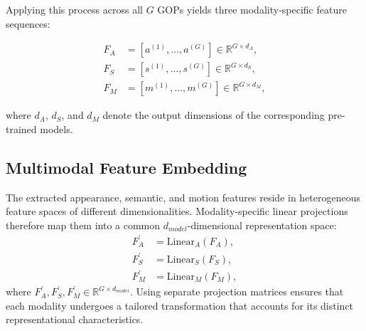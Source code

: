 Applying this process across all $G$ GOPs yields three modality-specific feature sequences:

\begin{align}
F_A&=\left[a^{\left(1\right)},\ldots,a^{\left(G\right)}\right]\in\mathbb{R}^{G\times d_A},\\
F_S&=\left[s^{\left(1\right)},\ldots,s^{\left(G\right)}\right]\in\mathbb{R}^{G\times d_S},\\
F_M&=\left[m^{\left(1\right)},\ldots,m^{\left(G\right)}\right]\in\mathbb{R}^{G\times d_M},
\end{align}


where $d_A$, $d_S$, and $d_M$ denote the output dimensions of the corresponding pre-trained models.


\subsection{Multimodal Feature Embedding}
\label{subsec:subsec_43_feat_emb}
The extracted appearance, semantic, and motion features reside in heterogeneous feature spaces of different dimensionalities. Modality-specific linear projections therefore map them into a common $d_{\textit{model}}$-dimensional representation space:
\begin{align}
F_A^\prime&={\mathrm{Linear}}_A(F_A),\\
F_S^\prime&={\mathrm{Linear}}_S(F_S),\\
F_M^\prime&={\mathrm{Linear}}_M(F_M),
\end{align}
where $F_A^\prime,F_S^\prime,F_M^\prime\in\mathbb{R}^{G\times d_{\textit{model}}}$. Using separate projection matrices ensures that each modality undergoes a tailored transformation that accounts for its distinct representational characteristics.

